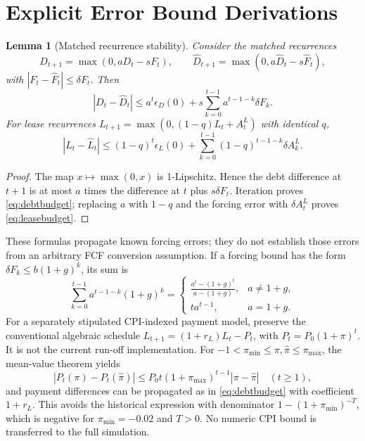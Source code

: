 \documentclass[11pt,a4paper]{article}
\theoremstyle{plain}
\newtheorem{lemma}{Lemma}
\theoremstyle{definition}
\begin{document}
\section{Explicit Error Bound Derivations}\label{app:error_bounds}
\begin{lemma}[Matched recurrence stability]\label{lem:error_bounds}
Consider the matched recurrences
\[
D_{t+1}=\max(0,aD_t-sF_t),\qquad
\widehat D_{t+1}=\max(0,a\widehat D_t-s\widehat F_t),
\]
with
$|F_t-\widehat F_t|\le\delta F_t$. Then
\begin{equation}
|D_t-\widehat D_t|\le a^t\epsilon_D(0)
 +s\sum_{k=0}^{t-1}a^{t-1-k}\delta F_k.\label{eq:debtbudget}
\end{equation}
For lease recurrences $L_{t+1}=\max(0,(1-q)L_t+A_t^L)$ with identical $q$,
\begin{equation}
|L_t-\widehat L_t|\le(1-q)^t\epsilon_L(0)
 +\sum_{k=0}^{t-1}(1-q)^{t-1-k}\delta A_k^L.
\label{eq:leasebudget}
\end{equation}
\end{lemma}
\begin{proof}
The map $x\mapsto\max(0,x)$ is 1-Lipschitz. Hence the debt difference at $t+1$
is at most $a$ times the difference at $t$ plus $s\delta F_t$.
Iteration proves \eqref{eq:debtbudget}; replacing $a$ with $1-q$ and the forcing
error with $\delta A_t^L$ proves \eqref{eq:leasebudget}.
\end{proof}
These formulas propagate known forcing errors; they do not establish those
errors from an arbitrary FCF conversion assumption. If a forcing bound has the
form $\delta F_k\le b(1+g)^k$, its sum is
\begin{equation}
\sum_{k=0}^{t-1}a^{t-1-k}(1+g)^k=
\begin{cases}\displaystyle\frac{a^t-(1+g)^t}{a-(1+g)},&a\ne1+g,\\
t a^{t-1},&a=1+g.
\end{cases}
\end{equation}
For a separately stipulated CPI-indexed payment model, preserve the conventional
algebraic schedule $L_{t+1}=(1+r_L)L_t-P_t$, with
$P_t=P_0(1+\pi)^t$. It is not the current run-off implementation. For
$-1<\pi_{\min}\le\pi,\widehat\pi\le\pi_{\max}$, the mean-value theorem yields
\begin{equation}
|P_t(\pi)-P_t(\widehat\pi)|\le
P_0t(1+\pi_{\max})^{t-1}|\pi-\widehat\pi|\quad(t\ge1),
\end{equation}
and payment differences can be propagated as in \eqref{eq:debtbudget} with
coefficient $1+r_L$. This avoids the historical expression with denominator
$1-(1+\pi_{\min})^{-T}$, which is negative for $\pi_{\min}=-0.02$ and $T>0$.
No numeric CPI bound is transferred to the full simulation.
\end{document}
